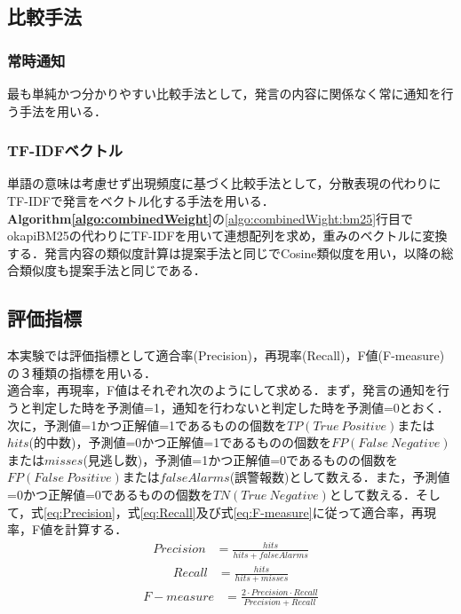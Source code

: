 \subsection{比較手法}
\subsubsection*{ 常時通知}
最も単純かつ分かりやすい比較手法として，発言の内容に関係なく常に通知を行う手法を用いる．
\subsubsection*{ TF-IDFベクトル}
単語の意味は考慮せず出現頻度に基づく比較手法として，分散表現の代わりにTF-IDFで発言をベクトル化する手法を用いる．\textbf{Algorithm\ref{algo:combinedWeight}}の\ref{algo:combinedWight:bm25}行目でokapiBM25の代わりにTF-IDFを用いて連想配列を求め，重みのベクトルに変換する．発言内容の類似度計算は提案手法と同じでCosine類似度を用い，以降の総合類似度も提案手法と同じである．
\subsection{評価指標}
本実験では評価指標として適合率(Precision)，再現率(Recall)，F値(F-measure)の３種類の指標を用いる．\\
適合率，再現率，F値はそれぞれ次のようにして求める．まず，発言の通知を行うと判定した時を予測値=1，通知を行わないと判定した時を予測値=0とおく．次に，予測値=1かつ正解値=1であるものの個数を$TP(True~Positive)$または$hits$(的中数)，予測値=0かつ正解値=1であるものの個数を$FP(False~Negative)$または$misses$(見逃し数)，予測値=1かつ正解値=0であるものの個数を$FP(False~Positive)$または$falseAlarms$(誤警報数)として数える．また，予測値=0かつ正解値=0であるものの個数を$TN(True~Negative)$として数える．そして，式\ref{eq:Precision}，式\ref{eq:Recall}及び式\ref{eq:F-measure}に従って適合率，再現率，F値を計算する．
\begin{equation}
\begin{aligned}
\label{eq:Precision}
Precision & = \frac{hits}{hits+falseAlarms}
\end{aligned}
\end{equation}
%
\begin{equation}
\begin{aligned}
\label{eq:Recall}
Recall & = \frac{hits}{hits+misses}
\end{aligned}
\end{equation}
%
\begin{equation}
\begin{aligned}
\label{eq:F-measure}
F-measure & = \frac{2 \cdot Precision \cdot Recall}{Precision+Recall}
\end{aligned}
\end{equation}

